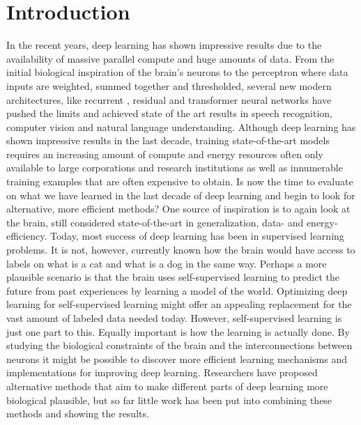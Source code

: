 \documentclass[a4paper,11pt]{article}
\begin{document}
\newpage
\tableofcontents
\thispagestyle{empty}

\newpage

\setcounter{page}{1}

\section{Introduction}
In the recent years, deep learning has shown impressive results due to the availability of massive parallel compute and huge amounts of data. From the initial biological inspiration of the brain’s neurons to the perceptron where data inputs are weighted, summed together and thresholded, several new modern architectures, like recurrent \cite{lstm}, residual \cite{resnet} and transformer neural networks \cite{transformers} have pushed the limits and achieved state of the art results in speech recognition, computer vision and natural language understanding. Although deep learning has shown impressive results in the last decade, training state-of-the-art models requires an increasing amount of compute and energy resources often only available to large corporations and research institutions as well as innumerable training examples that are often expensive to obtain. Is now the time to evaluate on what we have learned in the last decade of deep learning and begin to look for alternative, more efficient methods? One source of inspiration is to again look at the brain, still considered state-of-the-art in generalization, data- and energy-efficiency. Today, most success of deep learning has been in supervised learning problems. It is not, however, currently known how the brain would have access to labels on what is a cat and what is a dog in the same way. Perhaps a more plausible scenario is that the brain uses self-supervised learning to predict the future from past experiences by learning a model of the world. Optimizing deep learning for self-supervised learning might offer an appealing replacement for the vast amount of labeled data needed today. However, self-supervised learning is just one part to this. Equally important is how the learning is actually done. By studying the biological constraints of the brain and the interconnections between neurons it might be possible to discover more efficient learning mechanisms and implementations for improving deep learning. Researchers have proposed alternative methods that aim to make different parts of deep learning more biological plausible, but so far little work has been put into combining these methods and showing the results. 
\end{document}
